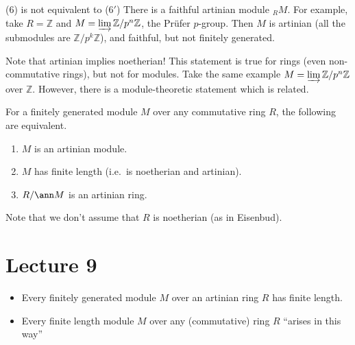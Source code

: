  \begin{remark}
   ($6$) is not equivalent to ($6'$) There is a faithful artinian module ${}_R M$. For
   example, take $R=\mathbb{Z}$ and $M = \varinjlim \mathbb{Z}/p^n\mathbb{Z}$, the Pr\"ufer $p$-group. Then
   $M$ is artinian (all the submodules are $\mathbb{Z}/p^k\mathbb{Z}$), and faithful, but not finitely
   generated.
 \end{remark}
 \begin{remark}
   Note that artinian implies noetherian! This statement is true for rings (even
   non-commutative rings), but not for modules. Take the same example $M = \varinjlim
   \mathbb{Z}/p^n\mathbb{Z}$ over $\mathbb{Z}$. However, there is a module-theoretic statement which is
   related.
 \end{remark}
 \begin{corollary}
   For a finitely generated module $M$ over any commutative ring $R$, the following are
   equivalent.
   \begin{enumerate}
     \item $M$ is an artinian module.
     \item $M$ has finite length (i.e.\ is noetherian and artinian).
     \item $R/\ann M$ is an artinian ring.
   \end{enumerate}
 \end{corollary}
 Note that we don't assume that $R$ is noetherian (as in Eisenbud).
 \setcounter{lecture}{9}
 \section{Lecture 9}

 \begin{itemize}
   \item Every finitely generated module $M$ over an artinian ring $R$ has finite length.
   \item Every finite length module $M$ over any (commutative) ring $R$ ``arises in this
   way''
 \end{itemize}

